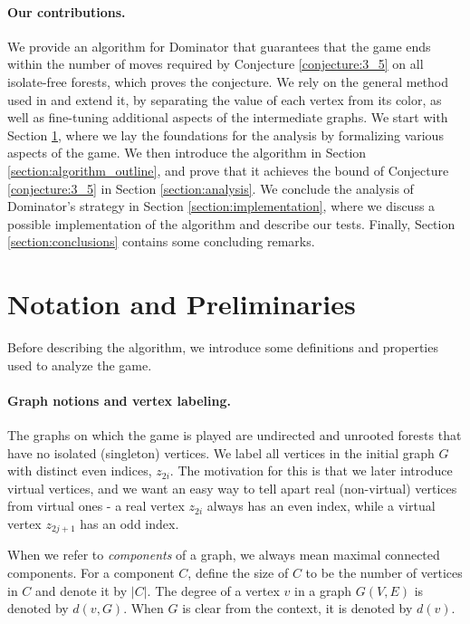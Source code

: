 \documentclass[11pt]{article}
\theoremstyle{definition}
\begin{document}
\paragraph{Our contributions.}
We provide an algorithm for Dominator that guarantees that the game ends within the number of moves required by Conjecture \ref{conjecture:3_5} on all isolate-free forests, which proves the conjecture.
We rely on the general method used in \cite{bujtas2015domination} and extend it, by separating the value of each vertex from its color, as well as fine-tuning additional aspects of the intermediate graphs. 
We start with Section \ref{section:dom_game_notations}, where we lay the foundations for the analysis by formalizing various aspects of the game.
We then introduce the algorithm in Section \ref{section:algorithm_outline}, and prove that it achieves the bound of Conjecture \ref{conjecture:3_5} in Section \ref{section:analysis}.
We conclude the analysis of Dominator's strategy in Section \ref{section:implementation}, where we discuss a possible implementation of the algorithm and describe our tests.
Finally, Section \ref{section:conclusions} contains some concluding remarks.

\section{Notation and Preliminaries}
\label{section:dom_game_notations}

Before describing the algorithm, we introduce some definitions and properties used to analyze the game.

\paragraph{Graph notions and vertex labeling.}
The graphs on which the game is played are undirected and unrooted forests that have no isolated (singleton) vertices.
We label all vertices in the initial graph $G$ with distinct even indices, $z_{2i}$.
The motivation for this is that we later introduce virtual vertices,
and we want an easy way to tell apart real (non-virtual) vertices from virtual ones - a real vertex $z_{2i}$ always has an even index, while a virtual vertex $z_{2j+1}$ has an odd index.

When we refer to \emph{components} of a graph, we always mean maximal connected components.
For a component $C$, define the size of $C$ to be the number of vertices in $C$ and denote it by $|C|$.
The degree of a vertex $v$ in a graph $G(V, E)$ is denoted by $d(v, G)$. When $G$ is clear from the context, it is denoted by $d(v)$.
\end{document}

